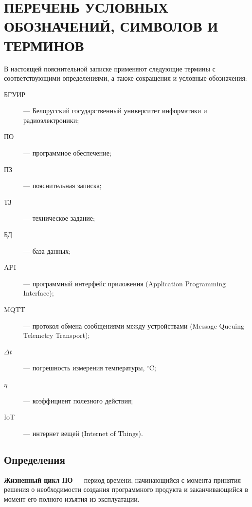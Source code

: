 \chapter*{ПЕРЕЧЕНЬ УСЛОВНЫХ ОБОЗНАЧЕНИЙ, СИМВОЛОВ И ТЕРМИНОВ}

В настоящей пояснительной записке применяют следующие термины с соответствующими определениями, а также сокращения и условные обозначения:

\vspace{0.5cm}

\begin{description}
    \item[БГУИР] --- Белорусский государственный университет информатики и радиоэлектроники;
    \item[ПО] --- программное обеспечение;
    \item[ПЗ] --- пояснительная записка;
    \item[ТЗ] --- техническое задание;
    \item[БД] --- база данных;
    \item[API] --- программный интерфейс приложения (Application Programming Interface);
    \item[MQTT] --- протокол обмена сообщениями между устройствами (Message Queuing Telemetry Transport);
    \item[$\Delta t$] --- погрешность измерения температуры, $^\circ$C;
    \item[$\eta$] --- коэффициент полезного действия;
    \item[IoT] --- интернет вещей (Internet of Things).
\end{description}

\vspace{0.5cm}

\section*{Определения}

\noindent \textbf{Жизненный цикл ПО} --- период времени, начинающийся с момента принятия решения о необходимости создания программного продукта и заканчивающийся в момент его полного изъятия из эксплуатации.

\newpage